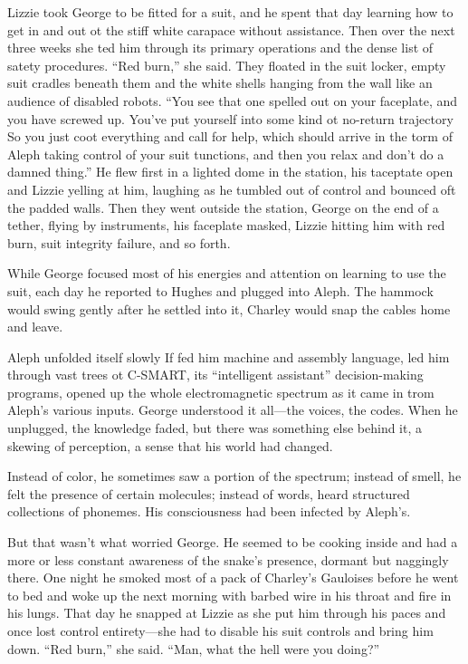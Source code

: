 Lizzie took George to be fitted for a suit, and he spent that day learning how to get in and out ot the stiff white carapace without assistance. Then over the next three weeks she ted him through its primary operations and the dense list of satety procedures.
``Red burn,'' she said. They floated in the suit locker, empty suit cradles beneath them and the white shells hanging from the wall like an audience of disabled robots. ``You see that one spelled out on your faceplate, and you have screwed up. You've put yourself into some kind ot no-return trajectory So you just coot everything and call for help, which should arrive in the torm of Aleph taking control of your suit tunctions, and then you relax and don't do a damned thing.''
He flew first in a lighted dome in the station, his taceptate open and Lizzie yelling at him, laughing as he tumbled out of control and bounced oft the padded walls. Then they went outside the station, George on the end of a tether, flying by instruments, his faceplate masked, Lizzie hitting him with red burn, suit integrity failure, and so forth.

While George focused most of his energies and attention on learning to use the suit, each day he reported to Hughes and plugged into Aleph. The hammock would swing gently after he settled into it, Charley would snap the cables home and leave.

Aleph unfolded itself slowly If fed him machine and assembly language, led him through vast trees ot C-SMART, its ``intelligent assistant'' decision-making programs, opened up the whole electromagnetic spectrum as it came in trom Aleph's various inputs. George understood it all—the voices, the codes. When he unplugged, the knowledge faded, but there was something else behind it, a skewing of perception, a sense that his world had changed.

Instead of color, he sometimes saw a portion of the spectrum; instead of smell, he felt the presence of certain molecules; instead of words, heard structured collections of phonemes. His consciousness had been infected by Aleph's.

But that wasn't what worried George. He seemed to be cooking inside and had a more or less constant awareness of the snake's presence, dormant but naggingly there. One night he smoked most of a pack of Charley's Gauloises before he went to bed and woke up the next morning with barbed wire in his throat and fire in his lungs. That day he snapped at Lizzie as she put him through his paces and once lost control entirety—she had to disable his suit controls and bring him down. ``Red burn,'' she said. ``Man, what the hell were you doing?''

